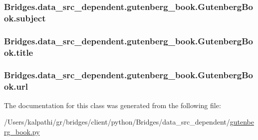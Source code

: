 \subsubsection[{subject}]{\setlength{\rightskip}{0pt plus 5cm}Bridges.\+data\+\_\+src\+\_\+dependent.\+gutenberg\+\_\+book.\+Gutenberg\+Book.\+subject}\label{class_bridges_1_1data__src__dependent_1_1gutenberg__book_1_1_gutenberg_book_acb11cd4bf2cd8a7c8d3c6ddd6838aeb7}
\hypertarget{class_bridges_1_1data__src__dependent_1_1gutenberg__book_1_1_gutenberg_book_ae290c959c98a7f5ef4452b4da0b36bce}{}
\subsubsection[{title}]{\setlength{\rightskip}{0pt plus 5cm}Bridges.\+data\+\_\+src\+\_\+dependent.\+gutenberg\+\_\+book.\+Gutenberg\+Book.\+title}\label{class_bridges_1_1data__src__dependent_1_1gutenberg__book_1_1_gutenberg_book_ae290c959c98a7f5ef4452b4da0b36bce}
\hypertarget{class_bridges_1_1data__src__dependent_1_1gutenberg__book_1_1_gutenberg_book_a77bf5cb37ad09e8c5fa06eee5e8a582b}{}
\subsubsection[{url}]{\setlength{\rightskip}{0pt plus 5cm}Bridges.\+data\+\_\+src\+\_\+dependent.\+gutenberg\+\_\+book.\+Gutenberg\+Book.\+url}\label{class_bridges_1_1data__src__dependent_1_1gutenberg__book_1_1_gutenberg_book_a77bf5cb37ad09e8c5fa06eee5e8a582b}


The documentation for this class was generated from the following file\+:\begin{DoxyCompactItemize}
\item 
/\+Users/kalpathi/gr/bridges/client/python/\+Bridges/data\+\_\+src\+\_\+dependent/\hyperlink{gutenberg__book_8py}{gutenberg\+\_\+book.\+py}\end{DoxyCompactItemize}
